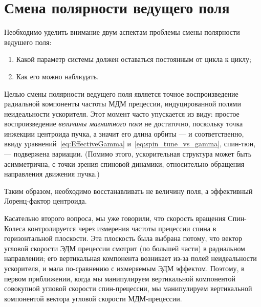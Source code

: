 

\section{Смена полярности ведущего поля}\label{chpt3:GFF}

Необходимо уделить внимание двум аспектам проблемы смены полярности ведушего поля:
\begin{enumerate}
	\item Какой параметр системы должен оставаться постоянным от цикла к циклу;
	\item Как его можно наблюдать.
\end{enumerate}

Целью смены полярности ведущего поля является точное воспроизведение радиальной компоненты
частоты МДМ прецессии, индуцированной полями неидеальности ускорителя. Этот момент часто упускается из виду:
простое воспроизведение \emph{величины магнитного поля} не достаточно, поскольку точка инжекции центроида пучка,
а значит его длина орбиты --- и соответственно, ввиду уравнений~\eqref{eq:EffectiveGamma}
 и~\eqref{eq:spin_tune_vs_gamma}, спин-тюн, --- подвержена вариации. (Помимо этого, ускорительная структура
  может быть асимметрична,	с точки зрения спиновой динамики, относительно обращения 
  направления движения пучка.)

Таким образом, необходимо восстанавливать не величину поля, а эффективный Лоренц-фактор центроида.

Касательно второго вопроса, мы уже говорили, что скорость вращения Спин-Колеса
контролируется через измерения частоты прецессии спина в горизонтальной плоскости. 
Эта плоскость была выбрана потому, что вектор угловой скорости ЭДМ прецессии смотрит
(по большей части) в радиальном направлении; его вертикальная компонента возникает из-за полей
неидеальности ускорителя, и мала по-сравнению с ихмеряемым ЭДМ эффектом.
Поэтому, в первом приближении, когда мы манипулируем вертикальной компонентой совокупной угловой скорости спин-прецессии, мы манипулируем вертикальной компонентой вектора угловой скорости МДМ-прецессии.

